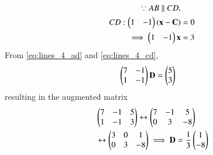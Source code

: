 \begin{enumerate}[label=\arabic*.,ref=\thesubsection.\theenumi]
\begin{align}
\because AB \parallel CD,&
\nonumber \\
CD: \begin{pmatrix}1 & -1\end{pmatrix}\left(\mathbf{x}-\mathbf{C}\right) &=0
\nonumber \\
\implies \begin{pmatrix}1 & -1\end{pmatrix}\mathbf{x} &=3
\label{eq:lines_4_cd}
\end{align}
%
From \eqref{eq:lines_4_ad} and \eqref{eq:lines_4_cd},
\begin{align}
 \begin{pmatrix}7 & -1 \\ 1 & -1\end{pmatrix}\mathbf{D} &=\begin{pmatrix}5 \\ 3\end{pmatrix}
\end{align}
resulting in the augmented matrix
\begin{align}
& \begin{pmatrix}7 & -1 & 5\\ 1 & -1 & 3\end{pmatrix} 
\leftrightarrow
 \begin{pmatrix}7 & -1 & 5\\ 0 & 3 & -8\end{pmatrix} 
\nonumber \\
&\leftrightarrow
 \begin{pmatrix}3 & 0 & 1\\ 0 & 3 & -8\end{pmatrix} \implies \mathbf{D} = \frac{1}{3}\begin{pmatrix}1\\-8\end{pmatrix}
\end{align}

%


\end{enumerate}
